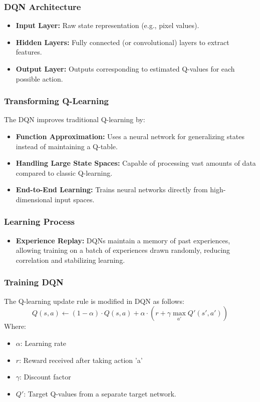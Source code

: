\documentclass[aspectratio=169]{beamer}
\begin{document}
\begin{frame}[fragile]
    \frametitle{DQN Architecture}
    \begin{itemize}
        \item \textbf{Input Layer:} Raw state representation (e.g., pixel values).
        
        \item \textbf{Hidden Layers:} Fully connected (or convolutional) layers to extract features.
        
        \item \textbf{Output Layer:} Outputs corresponding to estimated Q-values for each possible action.
    \end{itemize}
\end{frame}

\begin{frame}[fragile]
    \frametitle{Transforming Q-Learning}
    The DQN improves traditional Q-learning by:
    \begin{itemize}
        \item \textbf{Function Approximation:} 
        Uses a neural network for generalizing states instead of maintaining a Q-table.
        
        \item \textbf{Handling Large State Spaces:} 
        Capable of processing vast amounts of data compared to classic Q-learning.
        
        \item \textbf{End-to-End Learning:} 
        Trains neural networks directly from high-dimensional input spaces.
    \end{itemize}
\end{frame}

\begin{frame}[fragile]
    \frametitle{Learning Process}
    \begin{itemize}
        \item \textbf{Experience Replay:} 
        DQNs maintain a memory of past experiences, allowing training on a batch of experiences drawn randomly, reducing correlation and stabilizing learning.
    \end{itemize}
\end{frame}

\begin{frame}[fragile]
    \frametitle{Training DQN}
    The Q-learning update rule is modified in DQN as follows:
    \begin{equation}
    Q(s, a) \leftarrow (1 - \alpha) \cdot Q(s, a) + \alpha \cdot \left( r + \gamma \max_{a'} Q'(s', a') \right)
    \end{equation}
    Where:
    \begin{itemize}
        \item $\alpha$: Learning rate
        \item $r$: Reward received after taking action 'a'
        \item $\gamma$: Discount factor
        \item $Q'$: Target Q-values from a separate target network.
    \end{itemize}
\end{frame}
\end{document}
